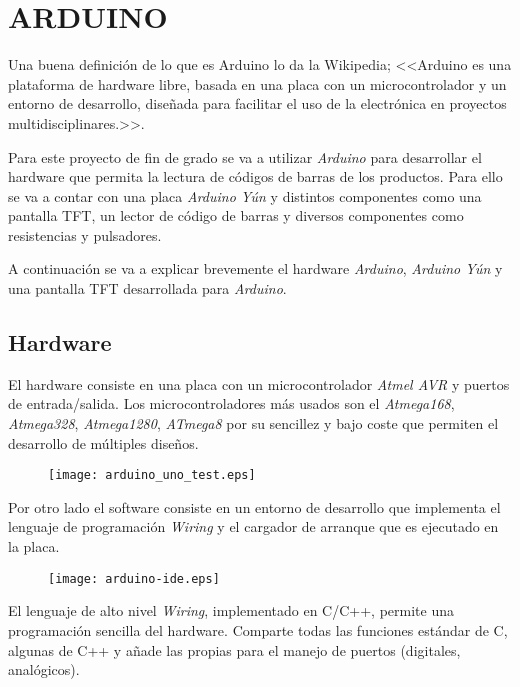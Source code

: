 \section{ARDUINO}

Una buena definición de lo que es Arduino lo da la Wikipedia; <<Arduino es una plataforma de hardware libre, basada en una placa con un microcontrolador y un entorno de desarrollo, diseñada para facilitar el uso de la electrónica en proyectos multidisciplinares.>>.

Para este proyecto de fin de grado se va a utilizar \emph{Arduino} para desarrollar el hardware que permita la lectura de códigos de barras de los productos. Para ello se va a contar con una placa \emph{Arduino Yún} y distintos componentes como una pantalla TFT, un lector de código de barras y diversos componentes como resistencias y pulsadores.

A continuación se va a explicar brevemente el hardware \emph{Arduino}, \emph{Arduino Yún} y una pantalla TFT desarrollada para \emph{Arduino}.

\subsection{Hardware}

El hardware consiste en una placa con un microcontrolador \emph{Atmel AVR} y puertos de entrada/salida. Los microcontroladores más usados son el \emph{Atmega168}, \emph{Atmega328}, \emph{Atmega1280}, \emph{ATmega8} por su sencillez y bajo coste que permiten el desarrollo de múltiples diseños.

\begin{figure}[h!]
    \centering
    \texttt{[image: arduino\_uno\_test.eps]}
    \label{fig:arduino_uno_test}
\end{figure}


Por otro lado el software consiste en un entorno de desarrollo que implementa el lenguaje de programación \emph{Wiring} y el cargador de arranque que es ejecutado en la placa.

\begin{figure}[h!]
    \centering
    \texttt{[image: arduino-ide.eps]}
    \label{fig:arduino-ide}
\end{figure}

El lenguaje de alto nivel \emph{Wiring}, implementado en C/C++, permite una programación sencilla del hardware. Comparte todas las funciones estándar de C, algunas de C++ y añade las propias para el manejo de puertos (digitales, analógicos).

